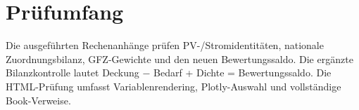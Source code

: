 \documentclass[
  ngerman,
  a4paper,
  DIV=11]{scrreprt}
\begin{document}
\section{Prüfumfang}\label{pruxfcfumfang}

Die ausgeführten Rechenanhänge prüfen PV-/Stromidentitäten, nationale
Zuordnungsbilanz, GFZ-Gewichte und den neuen Bewertungssaldo. Die
ergänzte Bilanzkontrolle lautet Deckung − Bedarf + Dichte =
Bewertungssaldo. Die HTML-Prüfung umfasst Variablenrendering,
Plotly-Auswahl und vollständige Book-Verweise.
\end{document}
